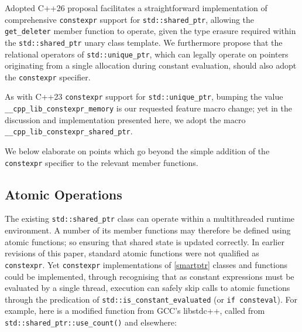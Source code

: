\documentclass[10pt]{article}
\newcommand*{\wgxxi}[1]{[\href{https://wg21.link/#1}{#1}]}
\begin{document}
Adopted C++26 proposal \cite{P2738R1} facilitates a straightforward
implementation of comprehensive \texttt{constexpr} support for
\texttt{std::shared\_ptr}, allowing the \texttt{get\_deleter} member function
to operate, given the type erasure required within the
\texttt{std::shared\_ptr} unary class template. We furthermore propose that the
relational operators of \texttt{std::unique\_ptr}, which can legally operate on
pointers originating from a single allocation during constant evaluation,
should also adopt the \texttt{constexpr} specifier.

As with C++23 \texttt{constexpr} support for \texttt{std::unique\_ptr}, bumping
the value \texttt{\_\_cpp\_lib\_constexpr\_memory} is our requested feature
macro change; yet in the discussion and implementation presented here, we adopt
the macro \texttt{\_\_cpp\_lib\_constexpr\_shared\_ptr}.

We below elaborate on points which go beyond the simple addition of the
\texttt{constexpr} specifier to the relevant member functions.

\subsection{Atomic Operations}

The existing \texttt{std::shared\_ptr} class can operate within a multithreaded
runtime environment. A number of its member functions may therefore be defined
using atomic functions; so ensuring that shared state is updated correctly. In
earlier revisions of this paper, standard atomic functions were not qualified
as \texttt{constexpr}. Yet \texttt{constexpr} implementations of
\wgxxi{smartptr} classes and functions could be implemented, through
recognising that as constant expressions must be evaluated by a single thread,
execution can safely skip calls to atomic functions through the
predication of \texttt{std::is\_constant\_evaluated} (or \texttt{if
consteval}). For example, here is a modified function from GCC's libstdc++,
called from \texttt{std::shared\_ptr::use\_count()} and elsewhere:

\end{document}
